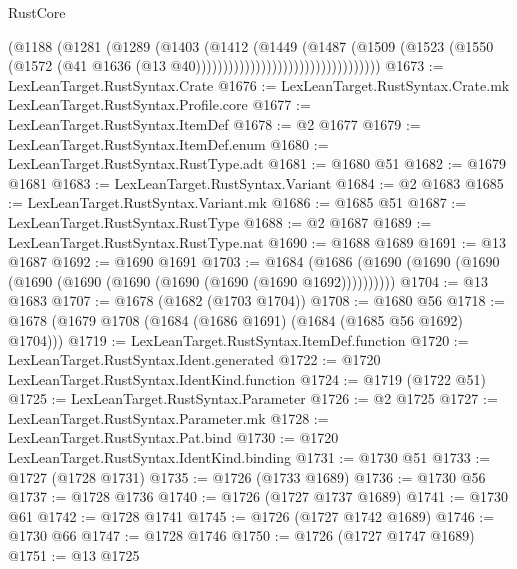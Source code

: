 \begin{lexlean}{RustCore}
\begin{coremodule}
                                              (@1188
                                                (@1281
                                                  (@1289
                                                    (@1403
                                                      (@1412
                                                        (@1449
                                                          (@1487
                                                            (@1509
                                                              (@1523
                                                                (@1550
                                                                  (@1572
                                                                    (@41
                                                                      @1636
                                                                      (@13
                                                                        @40))))))))))))))))))))))))))))))))))
@1673 := LexLeanTarget.RustSyntax.Crate
@1676 := LexLeanTarget.RustSyntax.Crate.mk LexLeanTarget.RustSyntax.Profile.core
@1677 := LexLeanTarget.RustSyntax.ItemDef
@1678 := @2 @1677
@1679 := LexLeanTarget.RustSyntax.ItemDef.enum
@1680 := LexLeanTarget.RustSyntax.RustType.adt
@1681 := @1680 @51
@1682 := @1679 @1681
@1683 := LexLeanTarget.RustSyntax.Variant
@1684 := @2 @1683
@1685 := LexLeanTarget.RustSyntax.Variant.mk
@1686 := @1685 @51
@1687 := LexLeanTarget.RustSyntax.RustType
@1688 := @2 @1687
@1689 := LexLeanTarget.RustSyntax.RustType.nat
@1690 := @1688 @1689
@1691 := @13 @1687
@1692 := @1690 @1691
@1703 := @1684 (@1686 (@1690 (@1690 (@1690 (@1690 (@1690 (@1690 (@1690 (@1690 (@1690 @1692))))))))))
@1704 := @13 @1683
@1707 := @1678 (@1682 (@1703 @1704))
@1708 := @1680 @56
@1718 := @1678 (@1679 @1708 (@1684 (@1686 @1691) (@1684 (@1685 @56 @1692) @1704)))
@1719 := LexLeanTarget.RustSyntax.ItemDef.function
@1720 := LexLeanTarget.RustSyntax.Ident.generated
@1722 := @1720 LexLeanTarget.RustSyntax.IdentKind.function
@1724 := @1719 (@1722 @51)
@1725 := LexLeanTarget.RustSyntax.Parameter
@1726 := @2 @1725
@1727 := LexLeanTarget.RustSyntax.Parameter.mk
@1728 := LexLeanTarget.RustSyntax.Pat.bind
@1730 := @1720 LexLeanTarget.RustSyntax.IdentKind.binding
@1731 := @1730 @51
@1733 := @1727 (@1728 @1731)
@1735 := @1726 (@1733 @1689)
@1736 := @1730 @56
@1737 := @1728 @1736
@1740 := @1726 (@1727 @1737 @1689)
@1741 := @1730 @61
@1742 := @1728 @1741
@1745 := @1726 (@1727 @1742 @1689)
@1746 := @1730 @66
@1747 := @1728 @1746
@1750 := @1726 (@1727 @1747 @1689)
@1751 := @13 @1725

\end{coremodule}
\end{lexlean}
